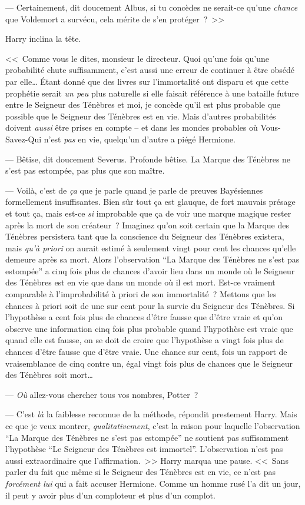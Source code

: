 --- Certainement, dit doucement Albus, si tu concèdes ne serait-ce qu'une \emph{chance} que Voldemort a survécu, cela mérite de s'en protéger~?~>>

Harry inclina la tête.

<<~Comme vous le dites, monsieur le directeur. Quoi qu'une fois qu'une probabilité chute suffisamment, c'est aussi une erreur de continuer à être obsédé par elle… Étant donné que des livres sur l'immortalité ont disparu et que cette prophétie serait \emph{un peu} plus naturelle si elle faisait référence à une bataille future entre le Seigneur des Ténèbres et moi, je concède qu'il est plus probable que possible que le Seigneur des Ténèbres est en vie. Mais d'autres probabilités doivent \emph{aussi} être prises en compte -- et dans les mondes probables où Vous-Savez-Qui n'est \emph{pas} en vie, quelqu'un d'autre a piégé Hermione.

--- Bêtise, dit doucement Severus. Profonde bêtise. La Marque des Ténèbres ne s'est pas estompée, pas plus que son maître.

--- Voilà, c'est de \emph{ça} que je parle quand je parle de preuves Bayésiennes formellement insuffisantes. Bien sûr tout ça est glauque, de fort mauvais présage et tout ça, mais est-ce \emph{si} improbable que ça de voir une marque magique rester après la mort de son créateur~? Imaginez qu'on soit certain que la Marque des Ténèbres persistera tant que la conscience du Seigneur des Ténèbres existera, mais \emph{qu'à priori} on aurait estimé à seulement vingt pour cent les chances qu'elle demeure après sa mort. Alors l'observation “La Marque des Ténèbres ne s'est pas estompée” a cinq fois plus de chances d'avoir lieu dans un monde où le Seigneur des Ténèbres est en vie que dans un monde où il est mort. Est-ce vraiment comparable à l'improbabilité à priori de son immortalité~? Mettons que les chances à priori soit de une sur cent pour la survie du Seigneur des Ténèbres. Si l'hypothèse a cent fois plus de chances d'être fausse que d'être vraie et qu'on observe une information cinq fois plus probable quand l'hypothèse est vraie que quand elle est fausse, on se doit de croire que l'hypothèse a vingt fois plus de chances d'être fausse que d'être vraie. Une chance sur cent, fois un rapport de vraisemblance de cinq contre un, égal vingt fois plus de chances que le Seigneur des Ténèbres soit mort…

--- \emph{Où} allez-vous chercher tous vos nombres, Potter~?

--- C'est \emph{là} la faiblesse reconnue de la méthode, répondit prestement Harry. Mais ce que je veux montrer, \emph{qualitativement}, c'est la raison pour laquelle l'observation “La Marque des Ténèbres ne s'est pas estompée” ne soutient pas suffisamment l'hypothèse “Le Seigneur des Ténèbres est immortel”. L'observation n'est pas aussi extraordinaire que l'affirmation.~>> Harry marqua une pause. <<~Sans parler du fait que même si le Seigneur des Ténèbres est en vie, ce n'est pas \emph{forcément lui} qui a fait accuser Hermione. Comme un homme rusé l'a dit un jour, il peut y avoir plus d'un comploteur et plus d'un complot.


